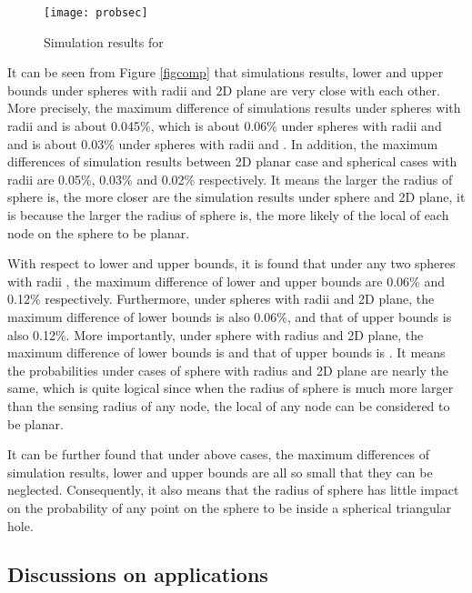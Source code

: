 \documentclass[journal, twoside]{IEEEtran}
\begin{document}
\begin{figure}[!ht]
  \centering
  \texttt{[image: probsec]}
  \caption{Simulation results for  }
  \label{figprobsec}
\end{figure}

It can be seen from Figure \ref{figcomp} that simulations results, lower and upper
bounds under spheres with radii  and 2D plane are 
very close with each other. More precisely, the maximum difference of simulations results
under spheres with radii  and  is about 0.045\%, which is about 0.06\%
under spheres with radii  and  and is about 0.03\% under spheres
with radii  and . In addition, the maximum differences of simulation
results between 2D planar case and spherical cases with radii 
are 0.05\%, 0.03\% and 0.02\% respectively. It means the larger the radius of sphere is,
the more closer are the simulation results under sphere and 2D plane, it is because
the larger the radius of sphere is, the more likely of the local of each node on the sphere
to be planar.

With respect to lower and upper bounds, it is found that under any two 
spheres with radii , the maximum difference of
lower and upper bounds are 0.06\% and 0.12\%  respectively. Furthermore,
under spheres with radii  and 2D plane, 
the maximum difference of lower bounds is also 0.06\%, and that of upper bounds
is also 0.12\%. More importantly, under sphere with radius  and 2D plane,
the maximum difference of lower bounds is  and that of
upper bounds is . It means the probabilities under cases of sphere with radius
 and 2D plane are nearly the same, which is quite logical since when
the radius of sphere is much more larger than the sensing radius of any node,
the local of any node can be considered to be planar.

It can be further found that under above cases, the maximum differences of simulation results,
lower and upper bounds are all so small that they can be neglected. Consequently,
it also means that the radius of sphere has little impact on the probability of any 
point on the sphere to be inside a spherical triangular hole. 

\subsection{Discussions on applications} \label{discussion}
\end{document}
